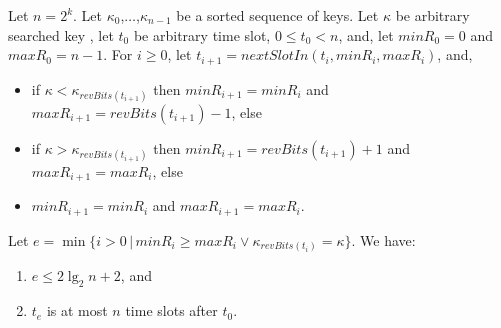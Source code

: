 \documentclass{llncs}
\begin{document}
\begin{theorem}\label{reliable-theorem}
Let $n=2^k$.
Let $\kappa_0$,$\ldots$,$\kappa_{n-1}$ be a sorted sequence of keys.
Let $\kappa$ be arbitrary searched key , 
let $t_0$ be arbitrary time slot, $0\le t_0<n$, and,
let $minR_0=0$ and $maxR_0=n-1$.
For $i\ge 0$, let $t_{i+1}= nextSlotIn(t_i, minR_i, maxR_i)$, and,
\begin{itemize}
\item
  if $\kappa<\kappa_{revBits(t_{i+1})}$ then $minR_{i+1}=minR_i$ and $maxR_{i+1}=revBits(t_{i+1})-1$,
  else
\item
  if $\kappa>\kappa_{revBits(t_{i+1})}$ then $minR_{i+1}=revBits(t_{i+1})+1$ and $maxR_{i+1}=maxR_i$,
  else 
\item
  $minR_{i+1}=minR_i$ and $maxR_{i+1}=maxR_i$.
\end{itemize}
Let $e=\min\{i>0 \,|\, minR_i\ge maxR_i \vee \kappa_{revBits(t_{i})}=\kappa\}$.
We have:
\begin{enumerate}
\item\label{reliable-energy}
  $e\le 2\lg_2 n+2$, and
\item\label{reliable-time}
  $t_e$ is at most $n$ time slots after $t_0$.
\end{enumerate}
\end{theorem}
\end{document}
